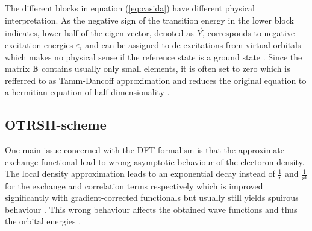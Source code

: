 The different blocks in equation (\ref{eq:casida}) have different physical interpretation.
As the negative sign of the transition energy in the lower block indicates, lower half of the eigen vector, denoted as $\vec{Y}$, corresponds to negative excitation energies $\varepsilon_i$ and can be assigned to de-excitations from virtual orbitals which makes no physical sense if the reference state is a ground state \cite{dreuw}.
Since the matrix $\mathbb{B}$ contains usually only small elements, it is often set to zero which is refferred to as Tamm-Dancoff approximation and reduces the original equation to a hermitian equation of half dimensionality \cite{casida}.

\subsection{OTRSH-scheme}
One main issue concerned with the DFT-formalism is that the approximate exchange functional lead to wrong asymptotic behaviour of the electoron density.
The local density approximation leads to an exponential decay instead of $\frac 1r$ and $\frac{1}{r^4}$ for the exchange and correlation terms respectively \cite{Bokareva} which is improved significantly with gradient-corrected functionals but usually still yields spuirous behaviour \cite{baerRSH}.
This wrong behaviour affects the obtained wave functions and thus the orbital energies \cite{OT-RSH}.

